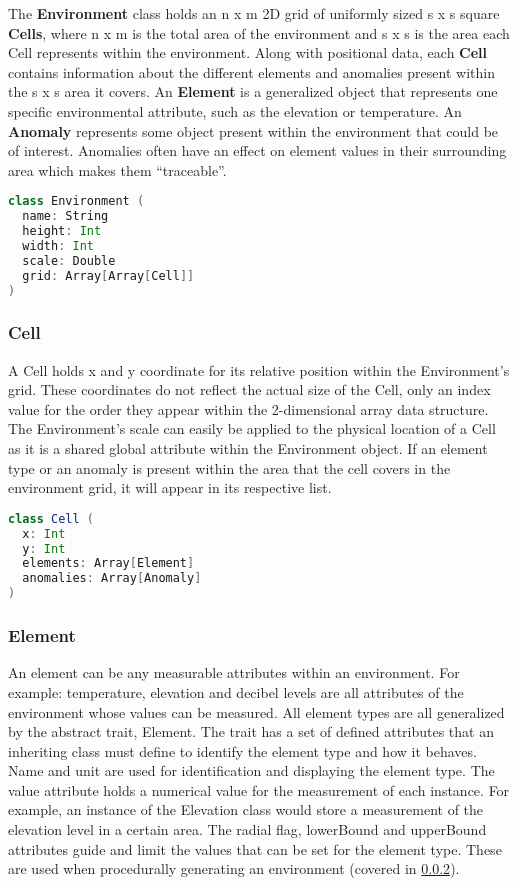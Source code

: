 The \textbf{Environment} class holds an n x m 2D grid of uniformly sized s x s square \textbf{Cells}, where n x m is the total area of the environment and s x s is the area each Cell represents within the environment.
Along with positional data, each \textbf{Cell} contains information about the different elements and anomalies present within the s x s area it covers.
An \textbf{Element} is a generalized object that represents one specific environmental attribute, such as the elevation or temperature.
An \textbf{Anomaly} represents some object present within the environment that could be of interest.
Anomalies often have an effect on element values in their surrounding area which makes them “traceable”.


\begin{lstlisting}[language=Scala]
class Environment (
  name: String
  height: Int
  width: Int
  scale: Double
  grid: Array[Array[Cell]]
)
\end{lstlisting}

\subsubsection{Cell}
A Cell holds x and y coordinate for its relative position within the Environment's grid.
These coordinates do not reflect the actual size of the Cell, only an index value for the order they appear within the 2-dimensional array data structure.
The Environment's scale can easily be applied to the physical location of a Cell as it is a shared global attribute within the Environment object.
If an element type or an anomaly is present within the area that the cell covers in the environment grid, it will appear in its respective list.

\begin{lstlisting}[language=Scala]
class Cell (
  x: Int
  y: Int
  elements: Array[Element]
  anomalies: Array[Anomaly]
)
\end{lstlisting}

\subsubsection{Element}
An element can be any measurable attributes within an environment.
For example: temperature, elevation and decibel levels are all attributes of the environment whose values can be measured.
All element types are all generalized by the abstract trait, Element.
The trait has a set of defined attributes that an inheriting class must define to identify the element type and how it behaves.
Name and unit are used for identification and displaying the element type.
The value attribute holds a numerical value for the measurement of each instance.
For example, an instance of the Elevation class would store a measurement of the elevation level in a certain area.
The radial flag, lowerBound and upperBound attributes guide and limit the values that can be set for the element type.
These are used when procedurally generating an environment (covered in \ref{}). 

